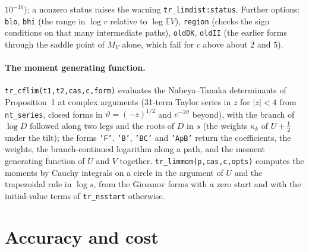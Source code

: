 \documentclass[11pt]{article}
\newcommand{\code}[1]{\texttt{#1}}
\newcommand{\E}{{\mathbb E}}
\begin{document}
$10^{-10}$); a nonzero status raises the warning \code{tr\_limdist:status}.  Further options: \code{blo}, \code{bhi} (the range in $\log v$ relative to $\log\E V$), \code{region} (checks the sign conditions on that many intermediate paths), \code{oldDK}, \code{oldII} (the earlier forms through the saddle point of $M_V$ alone, which fail for $c$ above about $2$ and $5$).

\paragraph{The moment generating function.}  \code{tr\_cflim(t1,t2,cas,c,form)} evaluates the Nabeya--Tanaka determinants of Proposition~1 at complex arguments (31-term Taylor series in $z$ for $|z|<4$ from \code{nt\_series}, closed forms in $\vartheta=(-z)^{1/2}$ and $e^{-2\vartheta}$ beyond), with the branch of $\log D$ followed along two legs and the roots of $D$ in $s$ (the weights $\kappa_k$ of $U+\frac12$ under the tilt); the forms \code{'F'}, \code{'B'}, \code{'BC'} and \code{'ApB'} return the coefficients, the weights, the branch-continued logarithm along a path, and the moment generating function of $U$ and $V$ together.  \code{tr\_limmom(p,cas,c,opts)} computes the moments by Cauchy integrals on a circle in the argument of $U$ and the trapezoidal rule in $\log s$, from the Girsanov forms with a zero start and with the initial-value terms of \code{tr\_nsstart} otherwise.

\section{Accuracy and cost}
\label{sec:accuracy}
\end{document}
